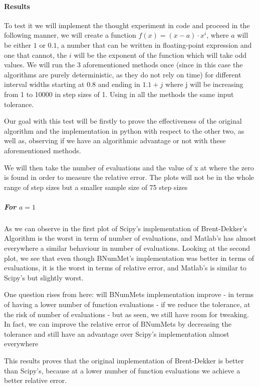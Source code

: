 \paragraph{Results}
To test it we will implement the thought experiment in code and proceed in the following manner, we will create a function $f(x) = (x-a)\cdot x^{i}$, where $a$ will be either $1$ or $0.1$, a number that can be written in floating-point expression and one that cannot, the $i$ will be the exponent of the function which will take odd values. We will run the 3 aforementioned methods once (since in this case the algorithms are purely deterministic, as they do not rely on time) for different interval widths starting at $0.8$ and ending in $1.1+j$ where j will be increasing from 1 to 10000 in step sizes of 1. Using in all the methods the same input tolerance.

Our goal with this test will be firstly to prove the effectiveness of the original algorithm and the implementation in python with respect to the other two, as well as, observing if we have an algorithmic advantage or not with these aforementioned methods.

We will then take the number of evaluations and the value of x at where the zero is found in order to measure the relative error. The plots will not be in the whole range of step sizes but a smaller sample size of 75 step sizes

\subparagraph{For $a=1$}
As we can observe in the first plot of Scipy's implementation of Brent-Dekker's Algorithm is the worst in term of number of evaluations, and Matlab's has almost everywhere a similar behaviour in number of evaluations. Looking at the second plot, we see that even though BNumMet's implementation was better in terms of evaluations, it is the worst in terms of relative error, and Matlab's is similar to Scipy's but slightly worst.

One question rises from here: will BNumMets implementation improve - in terms of having a lower number of function evaluations - if we reduce the tolerance, at the risk of number of evaluations - but as seen, we still have room for tweaking. In fact, we can improve the relative error of BNumMets by decreasing the tolerance and still have an advantage over Scipy's implementation almost everywhere 

This results proves that the original implementation of Brent-Dekker is better than Scipy's, because at a lower number of function evaluations we achieve a better relative error. 

